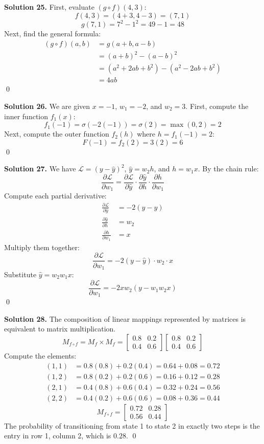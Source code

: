 \documentclass[11pt, letterpaper]{article}
\theoremstyle{definition}
\theoremstyle{remark}
\begin{document}
\textbf{Solution 25.}
First, evaluate $(g \circ f)(4, 3)$:
\[
f(4, 3) = (4 + 3, 4 - 3) = (7, 1)
\]
\[
g(7, 1) = 7^2 - 1^2 = 49 - 1 = 48
\]
Next, find the general formula:
\begin{align*}
(g \circ f)(a, b) &= g(a + b, a - b) \\
&= (a + b)^2 - (a - b)^2 \\
&= (a^2 + 2ab + b^2) - (a^2 - 2ab + b^2) \\
&= 4ab
\end{align*}
\qed

\textbf{Solution 26.}
We are given $x = -1$, $w_1 = -2$, and $w_2 = 3$.
First, compute the inner function $f_1(x)$:
\[
f_1(-1) = \sigma(-2(-1)) = \sigma(2) = \max(0, 2) = 2
\]
Next, compute the outer function $f_2(h)$ where $h = f_1(-1) = 2$:
\[
F(-1) = f_2(2) = 3(2) = 6
\]
\qed

\textbf{Solution 27.}
We have $\mathcal{L} = (y - \hat{y})^2$, $\hat{y} = w_2 h$, and $h = w_1 x$.
By the chain rule:
\[
\frac{\partial \mathcal{L}}{\partial w_1} = \frac{\partial \mathcal{L}}{\partial \hat{y}} \cdot \frac{\partial \hat{y}}{\partial h} \cdot \frac{\partial h}{\partial w_1}
\]
Compute each partial derivative:
\begin{align*}
\frac{\partial \mathcal{L}}{\partial \hat{y}} &= -2(y - \hat{y}) \\
\frac{\partial \hat{y}}{\partial h} &= w_2 \\
\frac{\partial h}{\partial w_1} &= x
\end{align*}
Multiply them together:
\[
\frac{\partial \mathcal{L}}{\partial w_1} = -2(y - \hat{y}) \cdot w_2 \cdot x
\]
Substitute $\hat{y} = w_2 w_1 x$:
\[
\frac{\partial \mathcal{L}}{\partial w_1} = -2x w_2 (y - w_1 w_2 x)
\]
\qed

\textbf{Solution 28.}
The composition of linear mappings represented by matrices is equivalent to matrix multiplication.
\[
M_{f \circ f} = M_f \times M_f = \begin{bmatrix} 0.8 & 0.2 \\ 0.4 & 0.6 \end{bmatrix} \begin{bmatrix} 0.8 & 0.2 \\ 0.4 & 0.6 \end{bmatrix}
\]
Compute the elements:
\begin{align*}
(1,1) &= 0.8(0.8) + 0.2(0.4) = 0.64 + 0.08 = 0.72 \\
(1,2) &= 0.8(0.2) + 0.2(0.6) = 0.16 + 0.12 = 0.28 \\
(2,1) &= 0.4(0.8) + 0.6(0.4) = 0.32 + 0.24 = 0.56 \\
(2,2) &= 0.4(0.2) + 0.6(0.6) = 0.08 + 0.36 = 0.44
\end{align*}
\[
M_{f \circ f} = \begin{bmatrix} 0.72 & 0.28 \\ 0.56 & 0.44 \end{bmatrix}
\]
The probability of transitioning from state 1 to state 2 in exactly two steps is the entry in row 1, column 2, which is $0.28$.
\qed
\end{document}
